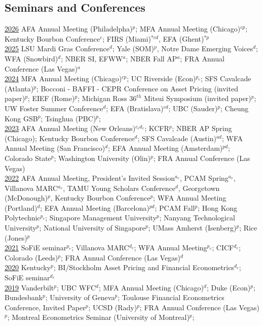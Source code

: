 \documentclass[margin,line,12pt]{res}
\begin{document}
\begin{resume}
\section{\sc\small Seminars and Conferences}
\underline{2026} AFA Annual Meeting (Philadelpha)$^{p}$; MFA Annual Meeting (Chicago)$^{cp}$; Kentucky Bourbon Conference$^{c}$; FIRS (Miami)$^{*cd}$, EFA (Ghent)$^{*p}$\\
\underline{2025} LSU Mardi Gras Conference$^{d}$; Yale (SOM)$^{p}$, Notre Dame Emerging Voices$^{d}$; WFA (Snowbird)$^{d}$; NBER SI, EFWW$^{a}$; NBER Fall AP$^{a}$; FRA Annual Conference (Las Vegas)$^{a}$\\
\underline{2024} MFA Annual Meeting (Chicago)$^{cp}$; UC Riverside (Econ)$^{p_v}$; SFS Cavalcade (Atlanta)$^{p}$; Bocconi - BAFFI - CEPR Conference on Asset Pricing (invited paper)$^{p}$; EIEF (Rome)$^{p}$;  Michigan Ross $36^{th}$ Mitsui Symposium (invited paper)$^{p}$; UW Foster Summer Conference$^{d}$; EFA (Bratislava)$^{cd}$; UBC (Sauder)$^{p}$; Cheung Kong GSB$^{p}$; Tsinghua (PBC)$^{p}$;\\
\underline{2023} AFA Annual Meeting (New Orleans)$^{c_vd_v}$; KCFR$^{p}$; NBER AP Spring (Chicago); Kentucky Bourbon Conference$^{d}$; SFS Cavalcade (Austin)$^{ad}$; WFA Annual Meeting (San Francisco)$^d$; EFA Annual Meeting (Amsterdam)$^{pd}$; Colorado State$^{p}$; Washington University (Olin)$^{p}$; FRA Annual Conference (Las Vegas)\\
\underline{2022} AFA Annual Meeting, President's Invited Session$^{a_v}$, PCAM Spring$^{a_v}$, Villanova MARC$^{a_v}$, TAMU Young Scholars Conference$^{d}$, Georgetown (McDonough)$^{p}$, Kentucky Bourbon Conference$^{p}$; WFA Annual Meeting (Portland)$^{d}$; EFA Annual Meeting (Barcelona)$^{pd}$; PCAM Fall$^{p}$; Hong Kong Polytechnic$^{p_v}$; Singapore Management University$^{p}$; Nanyang Technological University$^{p}$; National University of Singapore$^{p}$; UMass Amherst (Isenberg)$^{p}$; Rice (Jones)$^{p}$\\
\underline{2021} SoFiE seminar$^{p_v}$; Villanova MARC$^{d_v}$; WFA Annual Meeting$^{p_v}$; CICF$^{d_v}$; Colorado (Leeds)$^{p}$; FRA Annual Conference (Las Vegas)$^{d}$\\
\underline{2020} Kentucky$^{p}$; BI/Stockholm Asset Pricing and Financial Econometrics$^{d_v}$; SoFiE seminar$^{d_v}$\\
\underline{2019} Vanderbilt$^{p}$; UBC WFC$^{d}$; MFA Annual Meeting (Chicago)$^{d}$; Duke (Econ)$^{p}$; Bundesbank$^{p}$; University of Geneva$^{p}$; Toulouse Financial Econometrics Conference, Invited Paper$^{p}$; UCSD (Rady)$^{p}$; FRA Annual Conference (Las Vegas)$^{p}$; Montreal Econometrics Seminar (University of Montreal)$^{p}$;

\end{resume}
\end{document}
